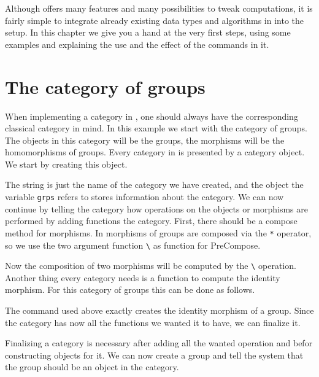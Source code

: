 Although \CapPkg offers many features and many possibilities to tweak computations,
it is fairly simple to integrate already existing data types and algorithms in \GAP
into the \CapPkg setup. In this chapter we give you a hand at the very first steps, using some
examples and explaining the use and the effect of the commands in it.

\section{The category of groups}

When implementing a category in \CapPkg, one should always have the corresponding classical
category in mind. In this example we start with the category of groups. The objects in this
category will be the groups, the morphisms will be the homomorphisms of groups. Every category
in \CapPkg is presented by a category \GAP object. We start by creating this object.



The string is just the name of the category we have created, and the object the variable
\texttt{grps} refers to stores information about the category. We can now continue by
telling the category how operations on the objects or morphisms are performed by adding
functions the category. First, there should be a compose method for morphisms. In \GAP
morphisms of groups are composed via the \texttt{*} operator, so we use the two
argument function \texttt{\textbackslash *} as function for \textrm{PreCompose}.



Now the composition of two morphisms will be computed by the \texttt{\textbackslash *} operation.
Another thing every category needs is a function to compute the identity morphism. For this
category of groups this can be done as follows.



The command used above exactly creates the identity morphism of a group. Since the category
has now all the functions we wanted it to have, we can finalize it.



Finalizing a category is necessary after adding all the wanted operation and befor constructing objects
for it. We can now create a group and tell the system that the group should be an object in the category.

